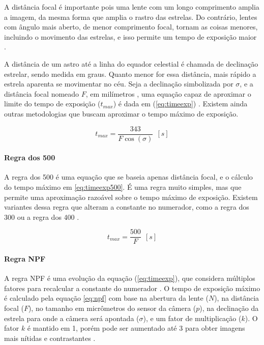 A distância focal é importante pois uma lente com um longo comprimento amplia a imagem, da mesma forma que amplia o rastro das estrelas. Do contrário, lentes com ângulo mais aberto, de menor comprimento focal, tornam as coisas menores, incluindo o movimento das estrelas, e isso permite um tempo de exposição maior \cite{book:astrophotographyAmateur}.

A distância de um astro até a linha do equador celestial é chamada de declinação estrelar, sendo medida em graus. Quanto menor for essa distância, mais rápido a estrela aparenta se movimentar no céu. Seja a declinação simbolizada por $\sigma$, e a distância focal nomeado $F$, em milímetros , uma equação capaz de aproximar o limite do tempo de exposição ($ t_{max} $) é dada em (\ref{eq:timeexp}) \cite{book:astrophotographyAmateur}. Existem ainda outras metodologias que buscam aproximar o tempo máximo de exposição. 

\begin{equation}
	t_{max} = \dfrac{343}{F\cos(\sigma)}~~[s]
	\label{eq:timeexp}
\end{equation}



\paragraph{Regra dos 500}

A regra dos 500 é uma equação que se baseia apenas distância focal, e o cálculo do tempo máximo em \ref{eq:timeexp500}. É uma regra muito simples, mas que permite uma aproximação razoável sobre o tempo máximo de exposição. Existem variantes dessa regra que alteram a constante no numerador, como a regra dos 300 ou a regra dos 400 \cite{site:500xNPF}.

\begin{equation}
	t_{max} = \dfrac{500}{F}~~[s]
	\label{eq:timeexp500}
\end{equation}

\paragraph{Regra NPF}
\label{sec:regraNPF}
A regra NPF é uma evolução da equação (\ref{eq:timeexp}), que considera múltiplos fatores para recalcular a constante do numerador
\cite{site:500xNPF}. O tempo de exposição máximo é calculado pela equação \ref{eq:npf} com base na abertura da lente ($ N $), na distância focal ($ F $), no tamanho em micrômetros do sensor da câmera ($ p $), na declinação da estrela para onde a câmera será apontada ($\sigma$), e um fator de multiplicação ($ k $). O fator $ k $ é mantido em 1, porém pode ser aumentado até 3 para obter imagens mais nítidas e contrastantes \cite{site:500xNPF}. 

